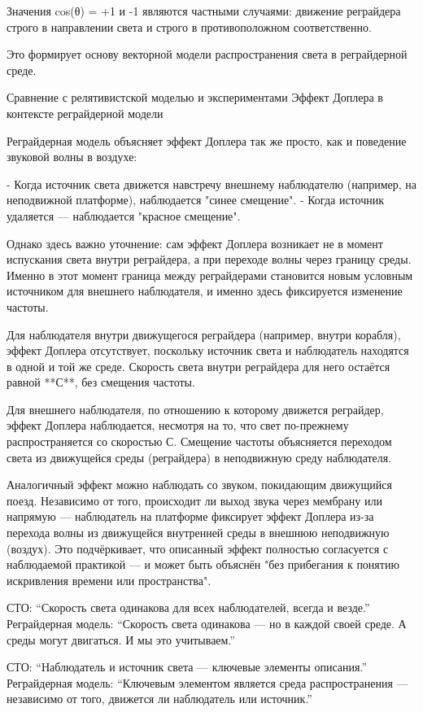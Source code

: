 \documentclass[12pt]{article}
\begin{document}
Значения cos(θ) = +1 и -1 являются частными случаями: движение реграйдера строго в направлении света и строго в противоположном соответственно.

Это формирует основу векторной модели распространения света в реграйдерной среде.


Сравнение с релятивистской моделью и экспериментами
Эффект Доплера в контексте реграйдерной модели

Реграйдерная модель объясняет эффект Доплера так же просто, как и поведение звуковой волны в воздухе:

- Когда источник света движется навстречу внешнему наблюдателю (например, на неподвижной платформе), наблюдается "синее смещение".
- Когда источник удаляется — наблюдается "красное смещение".

Однако здесь важно уточнение: сам эффект Доплера возникает не в момент испускания света внутри реграйдера, а при переходе волны через границу среды. Именно в этот момент граница между реграйдерами становится новым условным источником для внешнего наблюдателя, и именно здесь фиксируется изменение частоты.

Для наблюдателя внутри движущегося реграйдера (например, внутри корабля), эффект Доплера отсутствует, поскольку источник света и наблюдатель находятся в одной и той же среде. Скорость света внутри реграйдера для него остаётся равной **С**, без смещения частоты.

Для внешнего наблюдателя, по отношению к которому движется реграйдер, эффект Доплера наблюдается, несмотря на то, что свет по-прежнему распространяется со скоростью С. Смещение частоты объясняется переходом света из движущейся среды (реграйдера) в неподвижную среду наблюдателя.

Аналогичный эффект можно наблюдать со звуком, покидающим движущийся поезд. Независимо от того, происходит ли выход звука через мембрану или напрямую — наблюдатель на платформе фиксирует эффект Доплера из-за перехода волны из движущейся внутренней среды в внешнюю неподвижную (воздух). Это подчёркивает, что описанный эффект полностью согласуется с наблюдаемой практикой — и может быть объяснён "без прибегания к понятию искривления времени или пространства".

СТО: “Скорость света одинакова для всех наблюдателей, всегда и везде.”
Реграйдерная модель: “Скорость света одинакова — но в каждой своей среде. А среды могут двигаться. И мы это учитываем.”

СТО: “Наблюдатель и источник света — ключевые элементы описания.”
Реграйдерная модель: “Ключевым элементом является среда распространения — независимо от того, движется ли наблюдатель или источник.”
\end{document}

